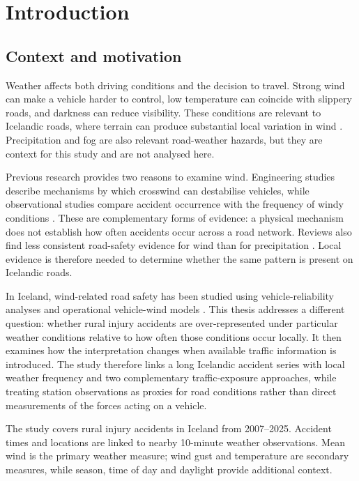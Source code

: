 \chapter{Introduction}

\section{Context and motivation}

Weather affects both driving conditions and the decision to travel. Strong
wind can make a vehicle harder to control, low temperature can coincide with
slippery roads, and darkness can reduce visibility. These conditions are
relevant to Icelandic roads, where terrain can produce substantial local
variation in wind \citep{snaebjornsson2007,pu2018}. Precipitation and fog are
also relevant road-weather hazards, but they are context for this study and
are not analysed here.

Previous research provides two reasons to examine wind. Engineering studies
describe mechanisms by which crosswind can destabilise vehicles, while
observational studies compare accident occurrence with the frequency of windy
conditions \citep{baker1986,baker1994risk,edwards1994}. These are complementary
forms of evidence: a physical mechanism does not establish how often accidents
occur across a road network. Reviews also find less consistent road-safety
evidence for wind than for precipitation \citep{theofilatos2014}. Local
evidence is therefore needed to determine whether the same pattern is present
on Icelandic roads.

In Iceland, wind-related road safety has been studied using vehicle-reliability
analyses and operational vehicle-wind models
\citep{snaebjornsson2007,hrafnkelsdottir2020}. This thesis addresses a
different question: whether rural injury accidents are over-represented under
particular weather conditions relative to how often those conditions occur
locally. It then examines how the interpretation changes when available traffic
information is introduced. The study therefore links a long Icelandic accident
series with local weather frequency and two complementary traffic-exposure
approaches, while treating station observations as proxies for road conditions
rather than direct measurements of the forces acting on a vehicle.

The study covers rural injury accidents in Iceland from 2007--2025. Accident
times and locations are linked to nearby 10-minute weather observations. Mean
wind is the primary weather measure; wind gust and temperature are secondary
measures, while season, time of day and daylight provide additional context.

